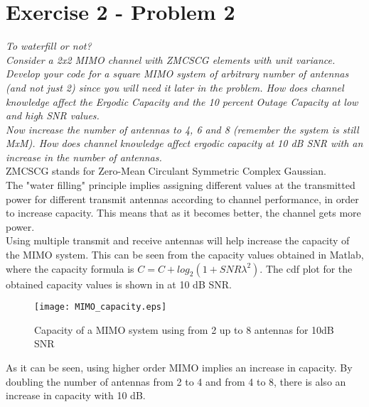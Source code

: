 \section{Exercise 2 - Problem 2}
\textit{To waterfill or not?}\\

\textit{Consider a 2x2 MIMO channel with ZMCSCG elements with unit variance. Develop your code for a square MIMO system of arbitrary number of antennas (and not just 2) since you will need it later in the problem. How does channel knowledge affect the Ergodic Capacity and the 10 percent Outage Capacity at low and high SNR values.} \\

\textit{Now increase the number of antennas to 4, 6 and 8 (remember the system is still MxM). How does channel knowledge affect ergodic capacity at 10 dB SNR with an increase in the number of antennas.}\\

ZMCSCG stands for Zero-Mean Circulant Symmetric Complex Gaussian. \\

The "water filling" principle implies assigning different values at the transmitted power for different transmit antennas according to channel performance, in order to increase capacity. This means that as it becomes better, the channel gets more power. \\

Using multiple transmit and receive antennas will help increase the capacity of the MIMO system. This can be seen from the capacity values obtained in Matlab, where the capacity formula is $C=C+log_{2}(1+SNR \lambda ^{2})$. The cdf plot for the obtained capacity values is shown in  at 10 dB SNR.
\begin{figure}[!h]
  \centering
  \texttt{[image: MIMO\_capacity.eps]}
  \caption{Capacity of a MIMO system using from 2 up to 8 antennas for 10dB SNR}
  \label{fig:MIMO_capacity}
\end{figure}
As it can be seen, using higher order MIMO implies an increase in capacity. By doubling the number of antennas from 2 to 4 and from 4 to 8, there is also an increase in capacity with 10 dB. \\

